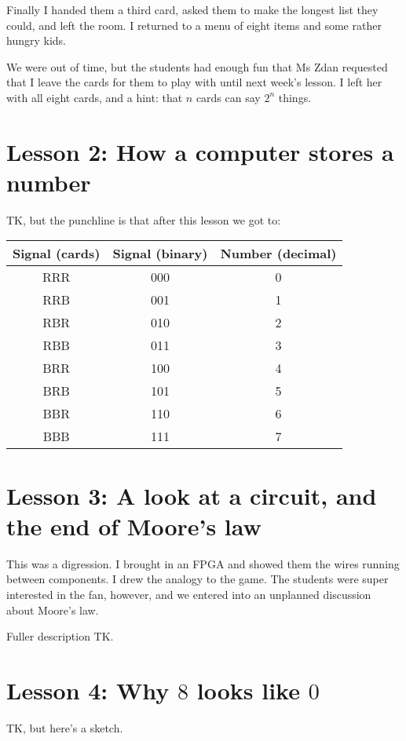 \documentclass[sigplan]{acmart}
\begin{document}
Finally I handed them a third card, asked them to make the longest list they could, and left the room.
I returned to a menu of eight items and some rather hungry kids.

We were out of time, but the students had enough fun that Ms Zdan requested that I leave the cards for them to play with until next week's lesson.
I left her with all eight cards, and a hint: that $n$ cards can say $2^n$ things.

\section*{Lesson 2: How a computer stores a number}

TK, but the punchline is that after this lesson we got to:

\begin{table}[h]\sffamily
  \begin{tabular}{ccc}
  Signal (cards) & Signal (binary) & Number (decimal) \\
  \midrule
  RRR & 000 & 0 \\
  RRB & 001 & 1 \\
  RBR & 010 & 2 \\
  RBB & 011 & 3 \\
  BRR & 100 & 4 \\
  BRB & 101 & 5 \\
  BBR & 110 & 6 \\
  BBB & 111 & 7 \\
  \end{tabular}
\end{table}

\section*{Lesson 3: A look at a circuit, and the end of Moore's law}

This was a digression.
I brought in an FPGA and showed them the wires running between components.
I drew the analogy to the game.
The students were super interested in the fan, however, and we entered into an unplanned discussion about Moore's law.

Fuller description TK.

\section*{Lesson 4: Why $8$ looks like $0$}

TK, but here's a sketch.
\end{document}
